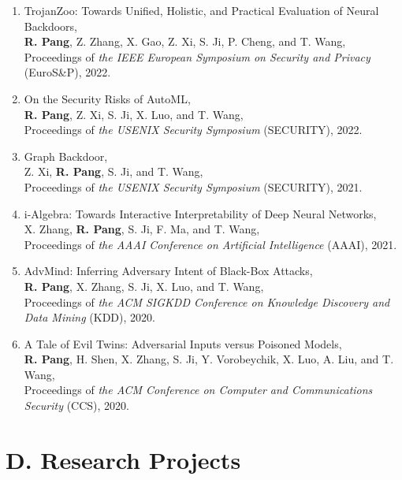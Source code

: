 \documentclass{resume}
\begin{document}
\begin{resume}
\begin{enumerate}[labelsep=15pt, parsep=8pt, resume]

\item TrojanZoo: Towards Unified, Holistic, and Practical Evaluation of Neural Backdoors,\\
\textbf{R. Pang}, Z. Zhang, X. Gao, Z. Xi, S. Ji, P. Cheng, and T. Wang,\\
Proceedings of {\it the IEEE European Symposium on Security and Privacy} (EuroS\&P), 2022.

\item On the Security Risks of AutoML,\\
\textbf{R. Pang}, Z. Xi, S. Ji, X. Luo, and T. Wang,\\
Proceedings of {\it the USENIX Security Symposium} (SECURITY), 2022.

\item Graph Backdoor,\\
Z. Xi, \textbf{R. Pang}, S. Ji, and T. Wang,\\
Proceedings of {\it the USENIX Security Symposium} (SECURITY), 2021.

\item i-Algebra: Towards Interactive Interpretability of Deep Neural Networks,\\
X. Zhang, \textbf{R. Pang}, S. Ji, F. Ma, and T. Wang,\\
Proceedings of {\it the AAAI Conference on Artificial Intelligence} (AAAI), 2021.

\item AdvMind: Inferring Adversary Intent of Black-Box Attacks,\\
\textbf{R. Pang}, X. Zhang, S. Ji, X. Luo, and T. Wang,\\
Proceedings of {\it the ACM SIGKDD Conference on Knowledge Discovery and Data Mining} (KDD), 2020.

\item A Tale of Evil Twins: Adversarial Inputs versus Poisoned Models,\\
\textbf{R. Pang}, H. Shen, X. Zhang, S. Ji, Y. Vorobeychik, X. Luo, A. Liu, and T. Wang,\\
Proceedings of {\it the ACM Conference on Computer and Communications Security} (CCS), 2020.

\end{enumerate}

\section{D. Research Projects}
\vspace{24pt}


\end{resume}
\end{document}
